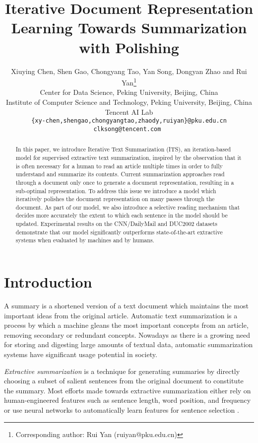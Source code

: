 \documentclass[11pt,a4paper]{article}
\title{Iterative Document Representation Learning Towards Summarization with Polishing}
\author{Xiuying Chen, Shen Gao, Chongyang Tao, Yan Song, Dongyan Zhao and Rui Yan\thanks{ Corresponding author: Rui Yan (ruiyan@pku.edu.cn) }\\
 Center for Data Science, Peking University, Beijing, China\\
 Institute of Computer Science and Technology, Peking University, Beijing, China\\
 Tencent AI Lab\\
 \tt \{xy-chen,shengao,chongyangtao,zhaody,ruiyan\}@pku.edu.cn\\
 \tt clksong@tencent.com
  }
\date{}
\begin{document}
\maketitle
\begin{abstract}
In this paper, we introduce Iterative Text Summarization (ITS), an iteration-based model for supervised extractive text summarization, inspired by the observation that it is often necessary for a human to read an article multiple times in order to fully understand and summarize its contents. Current summarization approaches read through a document only once to generate a document representation, resulting in a sub-optimal representation. To address this issue we introduce a model which iteratively polishes the document representation on many passes through the document. As part of our model, we also introduce a selective reading mechanism that decides more accurately the extent to which each sentence in the model should be updated. Experimental results on the CNN/DailyMail and DUC2002 datasets demonstrate that our model significantly outperforms state-of-the-art extractive systems when evaluated by machines and by humans.
\end{abstract}

\section{Introduction}

A summary is a shortened version of a text document which maintains the most important ideas from the original article. Automatic text summarization is a process by which a machine gleans the most important concepts from an article, removing secondary or redundant concepts. 
Nowadays as there is a growing need for storing and digesting large amounts of textual data, automatic summarization systems have significant usage potential in society.

\textit{Extractive summarization} is a technique for generating summaries by directly choosing a subset of salient sentences from the original document to constitute the summary. 
Most efforts made towards extractive summarization either rely on human-engineered features such as sentence length, word position, and frequency \cite{Cohen2002Natural,radev2004mead,Woodsend2010Automatic,Yan2011Summarize,Yan2011Evolutionary,yan2012visualizing} or use neural networks to automatically learn features for sentence selection \cite{Cheng2016Neural,Nallapati2016SummaRuNNer}. 
\end{document}
